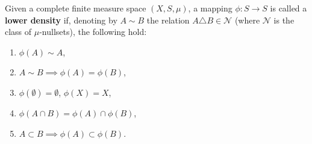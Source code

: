Given a complete finite measure space $(X, S, \mu)$, a mapping $\phi : S \to S$ is called a \textbf{lower density} if, denoting by $A \sim B$ the relation $A \triangle B \in \mathcal{N}$ (where $\mathcal{N}$ is the class of $\mu$-nullsets), the following hold:

\begin{enumerate}
\item $\phi(A) \sim A$,
\item $A \sim B \implies \phi(A) = \phi(B)$,
\item $\phi(\emptyset) = \emptyset$, $\phi(X) = X$,
\item $\phi(A \cap B) = \phi(A) \cap \phi(B)$,
\item $A \subset B \implies \phi(A) \subset \phi(B)$.
\end{enumerate}
